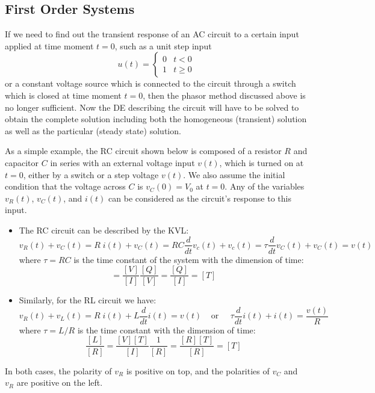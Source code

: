 \documentclass{article}
\begin{document}
  

\subsection*{First Order Systems}

If we need to find out the transient response of an AC circuit to a certain 
input applied at time moment $t=0$, such as a unit step input 
\begin{equation}
  u(t)=\left\{\begin{array}{ll}0&t<0\\1&t\ge 0\end{array}\right.
\end{equation}
or a constant voltage source which is connected to the circuit through a
switch which is closed at time moment $t=0$, then the phasor method discussed
above is no longer sufficient. Now the DE describing the circuit will have 
to be solved to obtain the complete solution including both the homogeneous 
(transient) solution as well as the particular (steady state) solution. 

As a simple example, the RC circuit shown below is composed of a resistor
$R$ and capacitor $C$ in series with an external voltage input $v(t)$, which 
is turned on at $t=0$, either by a switch or a step voltage $v(t)$. We also
assume the initial condition that the voltage across $C$ is $v_C(0)=V_0$ at
$t=0$. Any of the variables $v_R(t)$, $v_C(t)$, and $i(t)$ can be considered 
as the circuit's response to this input.


\begin{itemize}
\item The RC circuit can be described by the KVL:
  \begin{equation} 
    v_R(t)+v_C(t)=R\;i(t)+v_C(t)=RC\frac{d}{dt} v_c(t)+v_c(t)
    =\tau \frac{d}{dt} v_C(t)+v_C(t)=v(t) 
  \end{equation}
  where $\tau=RC$ is the time constant of the system with the dimension of time:
  \begin{equation}
    [RC]=\frac{[V]}{[I]}\frac{[Q]}{[V]}=\frac{[Q]}{[I]}=[T]	
  \end{equation}
\item Similarly, for the RL circuit we have:
  \begin{equation}
    v_R(t)+v_L(t)=R\; i(t)+L\frac{d}{dt} i(t)=v(t)\;\;\;\;\mbox{or}\;\;\;\;\;
    \tau \frac{d}{dt} i(t)+i(t)=\frac{v(t)}{R}	
  \end{equation}
  where $\tau=L/R$ is the time constant with the dimension of time:
  \begin{equation}
    \frac{[L]}{[R]}=\frac{[V][T]}{[I]}\frac{1}{[R]}=\frac{[R][T]}{[R]}=[T]	
  \end{equation}
\end{itemize}
In both cases, the polarity of $v_R$ is positive on top, and the polarities of
$v_C$ and $v_R$ are positive on the left.
\end{document}
